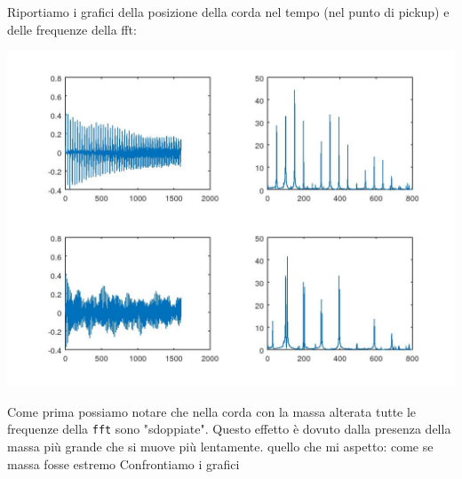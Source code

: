 \documentclass{article}
\begin{document}
	Riportiamo i grafici della posizione della corda nel tempo (nel punto di pickup) e delle frequenze della fft:
	
	\includegraphics[width=\textwidth]{vib-2.jpeg}
	
	Come prima possiamo notare che nella corda con la massa alterata tutte le frequenze della {\tt fft} sono "sdoppiate". Questo effetto è dovuto dalla presenza della massa più grande che si muove più lentamente.
	quello che mi aspetto: come se massa fosse estremo
	Confrontiamo i grafici
\end{document}
